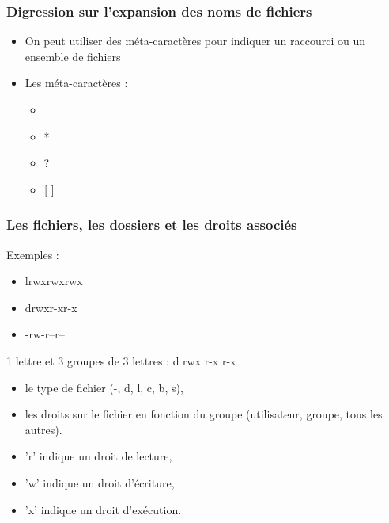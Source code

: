 \documentclass[handout,10pt]{beamer}
\begin{document}
\frame
{
    \frametitle{Digression sur l'expansion des noms de fichiers}

    \begin{itemize}
        \item On peut utiliser des méta-caractères pour indiquer un raccourci ou un ensemble de fichiers
        \item Les méta-caractères :
            \begin{itemize}
                \item \tild
                \item *
                \item ?
                \item $\mathnormal{[~]}$
            \end{itemize}
    \end{itemize}
}


\frame
{
    \frametitle{Les fichiers, les dossiers et les droits associés}

    Exemples :

    \begin{itemize}
        \item {\ttfamily lrwxrwxrwx}
        \item {\ttfamily drwxr-xr-x}
        \item {\ttfamily -rw-r--r--}
    \end{itemize}

    1 lettre et 3 groupes de 3 lettres : {\ttfamily d rwx r-x r-x}

    \begin{itemize}
        \item le type de fichier (-, d, l, c, b, s),
        \item les droits sur le fichier en fonction du groupe (utilisateur, groupe, tous les autres).
    \end{itemize}

    \begin{itemize}
        \item 'r' indique un droit de lecture,
        \item 'w' indique un droit d'écriture,
        \item 'x' indique un droit d'exécution.
    \end{itemize}
}
\end{document}
